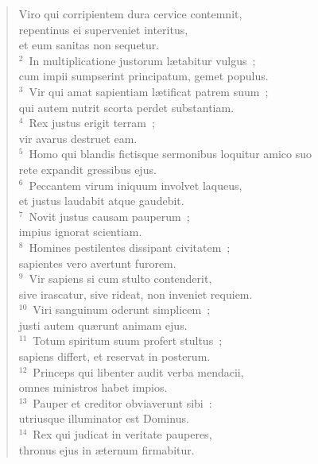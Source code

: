 \begin{flushleft}\begin{verse}\vspace{-19pt}\hspace{6pt}Viro qui corripientem dura cervice contemnit,\\\hspace{6pt} repentinus ei superveniet interitus,\\ et eum sanitas non sequetur.\\
${}^{2}$~In multiplicatione justorum l\ae tabitur vulgus~;\\ cum impii sumpserint principatum, gemet populus.\\
${}^{3}$~Vir qui amat sapientiam l\ae tificat patrem suum~;\\ qui autem nutrit scorta perdet substantiam.\\
${}^{4}$~Rex justus erigit terram~;\\ vir avarus destruet eam.\\
${}^{5}$~Homo qui blandis fictisque sermonibus loquitur amico suo\\ rete expandit gressibus ejus.\\
${}^{6}$~Peccantem virum iniquum involvet laqueus,\\ et justus laudabit atque gaudebit.\\
${}^{7}$~Novit justus causam pauperum~;\\ impius ignorat scientiam.\\
${}^{8}$~Homines pestilentes dissipant civitatem~;\\ sapientes vero avertunt furorem.\\
${}^{9}$~Vir sapiens si cum stulto contenderit,\\ sive irascatur, sive rideat, non inveniet requiem.\\
${}^{10}$~Viri sanguinum oderunt simplicem~;\\ justi autem qu\ae runt animam ejus.\\
${}^{11}$~Totum spiritum suum profert stultus~;\\ sapiens differt, et reservat in posterum.\\
${}^{12}$~Princeps qui libenter audit verba mendacii,\\ omnes ministros habet impios.\\
${}^{13}$~Pauper et creditor obviaverunt sibi~:\\ utriusque illuminator est Dominus.\\
${}^{14}$~Rex qui judicat in veritate pauperes,\\ thronus ejus in \ae ternum firmabitur.\end{verse}\end{flushleft}


